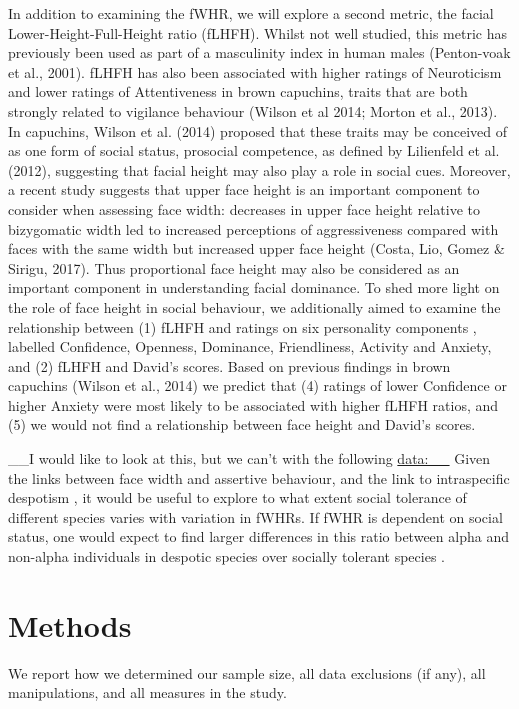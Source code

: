 \documentclass[english,man]{apa6}
\theoremstyle{definition}
\theoremstyle{definition}
\theoremstyle{remark}
\begin{document}
In addition to examining the fWHR, we will explore a second metric, the
facial Lower-Height-Full-Height ratio (fLHFH). Whilst not well studied,
this metric has previously been used as part of a masculinity index in
human males (Penton-voak et al., 2001). fLHFH has also been associated
with higher ratings of Neuroticism and lower ratings of Attentiveness in
brown capuchins, traits that are both strongly related to vigilance
behaviour (Wilson et al 2014; Morton et al., 2013). In capuchins, Wilson
et al. (2014) proposed that these traits may be conceived of as one form
of social status, prosocial competence, as defined by Lilienfeld et al.
(2012), suggesting that facial height may also play a role in social
cues. Moreover, a recent study suggests that upper face height is an
important component to consider when assessing face width: decreases in
upper face height relative to bizygomatic width led to increased
perceptions of aggressiveness compared with faces with the same width
but increased upper face height (Costa, Lio, Gomez \& Sirigu, 2017).
Thus proportional face height may also be considered as an important
component in understanding facial dominance. To shed more light on the
role of face height in social behaviour, we additionally aimed to
examine the relationship between (1) fLHFH and ratings on six
personality components , labelled Confidence, Openness, Dominance,
Friendliness, Activity and Anxiety, and (2) fLHFH and David's scores.
Based on previous findings in brown capuchins (Wilson et al., 2014) we
predict that (4) ratings of lower Confidence or higher Anxiety were most
likely to be associated with higher fLHFH ratios, and (5) we would not
find a relationship between face height and David's scores.

\_\_I would like to look at this, but we can't with the following
\url{data:__} Given the links between face width and assertive
behaviour, and the link to intraspecific despotism , it would be useful
to explore to what extent social tolerance of different species varies
with variation in fWHRs. If fWHR is dependent on social status, one
would expect to find larger differences in this ratio between alpha and
non-alpha individuals in despotic species over socially tolerant species
.

\section{Methods}\label{methods}

We report how we determined our sample size, all data exclusions (if
any), all manipulations, and all measures in the study.
\end{document}

